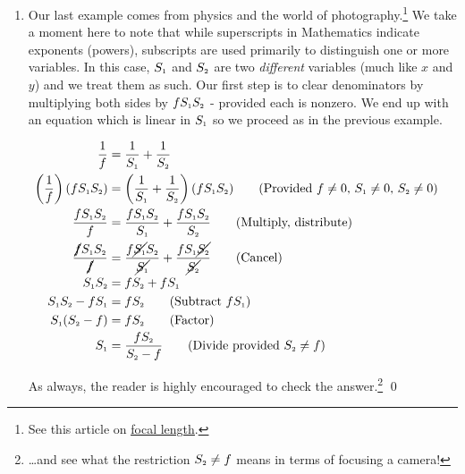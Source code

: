 \begin{ex}
\begin{enumerate}
We highly encourage the reader to check the answer algebraically to see where the restrictions on $x$ and $y$ come into play.\footnote{It involves simplifying a compound fraction!}

\item  Our last example comes from physics and the world of photography.\footnote{See this article on \href{https://en.wikipedia.org/wiki/Focal_length}{\underline{focal length}}.}  We take a moment here to note that while superscripts in Mathematics indicate exponents (powers), subscripts are used primarily to distinguish one or more variables.  In this case, $S_{\text{\tiny $1$}}$ and $S_{\text{\tiny $2$}}$ are two \textit{different} variables (much like $x$ and $y$) and we treat them as such. Our first step is to clear denominators by multiplying both sides by $f S_{\text{\tiny $1$}} S_{\text{\tiny $2$}}$ - provided each is nonzero.  We end up with an equation which is linear in $S_{\text{\tiny $1$}}$ so we proceed as in the previous example.

\begin{align*}
\dfrac{1}{f} & = \dfrac{1}{S_{\text{\tiny $1$}}} + \dfrac{1}{S_{\text{\tiny $2$}}} \\ 
\left(\dfrac{1}{f}\right)(fS_{\text{\tiny $1$}}S_{\text{\tiny $2$}}) & = \left(\dfrac{1}{S_{\text{\tiny $1$}}} + \dfrac{1}{S_{\text{\tiny $2$}}}\right) (fS_{\text{\tiny $1$}}S_{\text{\tiny $2$}}) \tag{Provided $f \neq 0$, $S_{\text{\tiny $1$}} \neq 0$, $S_{\text{\tiny $2$}}\neq 0$} \\ 
\dfrac{fS_{\text{\tiny $1$}}S_{\text{\tiny $2$}}}{f} & = \dfrac{fS_{\text{\tiny $1$}}S_{\text{\tiny $2$}}}{S_{\text{\tiny $1$}}} + \dfrac{fS_{\text{\tiny $1$}}S_{\text{\tiny $2$}}}{S_{\text{\tiny $2$}}} \tag{Multiply, distribute} \\ 
\dfrac{\cancel{f}S_{\text{\tiny $1$}}S_{\text{\tiny $2$}}}{\cancel{f}} & = \dfrac{f\cancel{S_{\text{\tiny $1$}}}S_{\text{\tiny $2$}}}{\cancel{S_{\text{\tiny $1$}}}} + \dfrac{fS_{\text{\tiny $1$}}\cancel{S_{\text{\tiny $2$}}}}{\cancel{S_{\text{\tiny $2$}}}} \tag{Cancel} \\ 
S_{\text{\tiny $1$}}S_{\text{\tiny $2$}} & = f S_{\text{\tiny $2$}} + fS_{\text{\tiny $1$}} & \\ 
S_{\text{\tiny $1$}}S_{\text{\tiny $2$}}  - fS_{\text{\tiny $1$}} & = f S_{\text{\tiny $2$}}   \tag{Subtract $fS_{\text{\tiny $1$}}$} \\ 
S_{\text{\tiny $1$}}(S_{\text{\tiny $2$}} - f) & = f S_{\text{\tiny $2$}} \tag{Factor}  \\ 
S_{\text{\tiny $1$}} & = \dfrac{f S_{\text{\tiny $2$}}}{S_{\text{\tiny $2$}} - f} \tag{Divide provided  $S_{\text{\tiny $2$}} \neq f$}  \\
\end{align*}

As always, the reader is highly encouraged to check the answer.\footnote{\ldots and see what the restriction $S_{\text{\tiny $2$}} \neq f$ means in terms of focusing a camera!}  \qed

\end{enumerate}

\end{ex}

